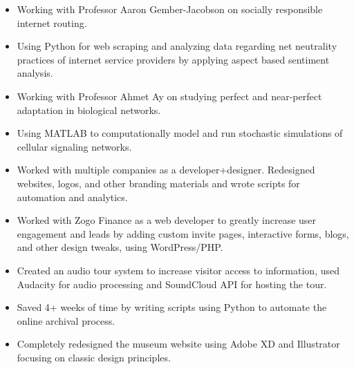 \documentclass[a4paper]{resume}
\begin{document}
\begin{itemize} \vspace{-5pt} \itemsep -2pt
	\item Working with Professor Aaron Gember-Jacobson on socially responsible internet routing.
	\item Using Python for web scraping and analyzing data regarding net neutrality practices of internet service providers by applying aspect based sentiment analysis.	
\end{itemize}
\enresubsection
{}
\begin{itemize} \vspace{-5pt} \itemsep -2pt
	\item Working with Professor Ahmet Ay on studying perfect and near-perfect adaptation in biological networks. 
	\item Using MATLAB to computationally model and run stochastic simulations of cellular signaling networks. 
\end{itemize}
\enresubsection
{}
\begin{itemize} \vspace{-5pt} \itemsep -2pt
	\item Worked with multiple companies as a developer+designer. Redesigned websites, logos, and other branding materials and wrote scripts for automation and analytics.
	\item Worked with Zogo Finance as a web developer to greatly increase user engagement and leads by adding custom invite pages, interactive forms, blogs, and other design tweaks, using WordPress/PHP.
\end{itemize}
\enresubsection
{}
\begin{itemize} \vspace{-5pt} \itemsep -2pt
	\item Created an audio tour system to increase visitor access to information, used Audacity for audio processing and SoundCloud API for hosting the tour.
	\item Saved 4+ weeks of time by writing scripts using Python to automate the online archival process.
	\item Completely redesigned the museum website using Adobe XD and Illustrator focusing on classic design principles.
\end{itemize}
\end{document}
